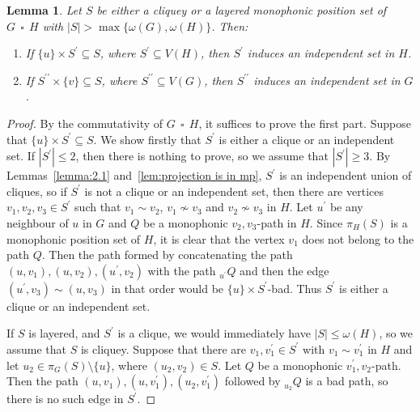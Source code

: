 \documentclass[12pt]{article}
\newtheorem{lemma}[theorem]{Lemma}
\DeclareMathOperator{\cp}{\,\square\,}
\begin{document}
\begin{lemma}
\label{lem:S' is independent} Let $S$ be either a cliquey or a layered monophonic position set of $G\cp H$ with $|S| > \max \{ \omega (G),\omega (H)\} $. Then:
\begin{enumerate}
    \item[$($a$)$] If $\{ u\} \times S^{\prime } \subseteq S$, where $S^{\prime } \subseteq V(H)$, then $S^{\prime }$ induces an independent set in $H$. 
    \item[$($b$)$] If $S^{\prime \prime } \times \{ v\} \subseteq S$, where $S^{\prime\prime } \subseteq V(G)$, then $S^{\prime\prime }$ induces an independent set in $G$.
   \end{enumerate}
\end{lemma}

\begin{proof} By the commutativity of $G\cp
H$, it suffices to prove the first part.
Suppose that $\{ u\} \times S^{\prime } \subseteq S$. We show firstly that $S^{\prime }$ is either a clique or an independent set. If $|S^{\prime }| \leq 2$, then there is nothing to prove, so we assume that $|S^{\prime }| \geq 3$. By Lemmas~\ref{lemma:2.1} and~\ref{lem:projection is in mp}, $S^{\prime }$ is an independent union of cliques, so if $S^{\prime }$ is not a clique or an independent set, then there are vertices $v_1,v_2,v_3 \in S^{\prime }$ such that $v_1 \sim v_2$, $v_1 \not \sim v_3$ and $v_2 \not \sim v_3$ in $H$. Let $u^{\prime }$ be any neighbour of $u$ in $G$ and $Q$ be a monophonic $v_2,v_3$-path in $H$. Since $\pi_H(S)$ is a monophonic position set of $H$, it is clear that the vertex $v_1$ does not belong to the path $Q$. Then the path formed by concatenating the path $(u,v_1),(u,v_2),(u^{\prime },v_2)$ with the path $_{u^{\prime }}Q$ and then the edge $(u^{\prime },v_3) \sim (u,v_3)$ in that order would be $\{ u\} \times S^{\prime }$-bad. Thus $S^{\prime }$ is either a clique or an independent set.

    If $S$ is layered, and $S^{\prime }$ is a clique, we would immediately have $|S| \leq \omega (H)$, so we assume that $S$ is cliquey. Suppose that there are $v_1,v_1^{\prime } \in S^{\prime }$ with $v_1 \sim v_1^{\prime }$ in $H$ and let $u_2 \in \pi _G(S) \setminus \{ u\} $, where $(u_2,v_2) \in S$. Let $Q$ be a monophonic $v_1^{\prime },v_2$-path. Then the path $(u,v_1),(u,v_1^{\prime }),(u_2,v_1^{\prime })$ followed by $_{u_2}Q$ is a bad path, so there is no such edge in $S^{\prime }$. 
\end{proof}
\end{document}
